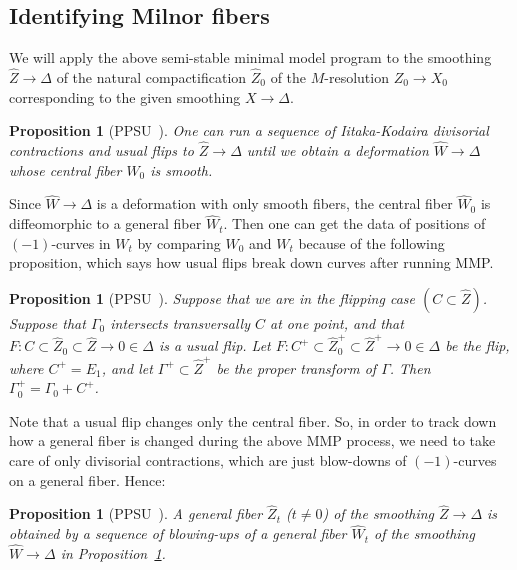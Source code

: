 \documentclass[reqno, twoside, a4paper]{amsart}
\newtheorem{proposition}[theorem]{Proposition}
\theoremstyle{definition}
\numberwithin{equation}{section}
\begin{document}
\subsection{Identifying Milnor fibers}

We will apply the above semi-stable minimal model program to the smoothing $\widehat{Z} \to \Delta$ of the natural compactification $\widehat{Z}_0$ of the $M$-resolution $Z_0 \to X_0$ corresponding to the given smoothing $X \to \Delta$.

\begin{proposition}[{PPSU~\cite[Theorem~9.4]{PPSU-2015}}]
\label{proposition:smoothable-by-flips}
One can run a sequence of Iitaka-Kodaira divisorial contractions and usual flips to $\widehat{Z} \to \Delta$ until we obtain a deformation $\widehat{W} \to \Delta$ whose central fiber $W_0$ is smooth.
\end{proposition}

Since $\widehat{W} \to \Delta$ is a deformation with only smooth fibers, the central fiber $\widehat{W}_0$ is diffeomorphic to a general fiber $\widehat{W}_t$. Then one can get the data of positions of $(-1)$-curves in $W_t$ by comparing $W_0$ and $W_t$ because of the following proposition, which says how usual flips break down curves after running MMP.

\begin{proposition}[{PPSU~\cite[Proposition~8.9]{PPSU-2015}}]
\label{proposition:degenerationCurves}
Suppose that we are in the flipping case $(C \subset \widehat{Z})$.
Suppose that $\Gamma_0$ intersects transversally $C$ at one point, and that $F \colon C \subset \widehat{Z}_0 \subset \widehat{Z} \to 0 \in \Delta$ is a usual flip. Let $F \colon C^+ \subset \widehat{Z}_0^+ \subset \widehat{Z}^+ \to 0 \in \Delta$ be the flip, where $C^+=E_1$, and let $\Gamma^+ \subset \widehat{Z}^+$ be the proper transform of $\Gamma$. Then $\Gamma^+_0 = \Gamma_0 + C^+$.
\end{proposition}

Note that a usual flip changes only the central fiber. So, in order to track down how a general fiber is changed during the above MMP process, we need to take care of only divisorial contractions, which are just blow-downs of $(-1)$-curves on a general fiber. Hence:

\begin{proposition}[{PPSU~\cite[Corollary~9.5]{PPSU-2015}}]
A general fiber $\widehat{Z}_t$ ($t \neq 0$) of the smoothing $\widehat{Z} \to \Delta$ is obtained by a sequence of blowing-ups of a general fiber $\widehat{W}_t$ of the smoothing $\widehat{W} \to \Delta$ in Proposition~\ref{proposition:smoothable-by-flips}.
\end{proposition}
\end{document}
